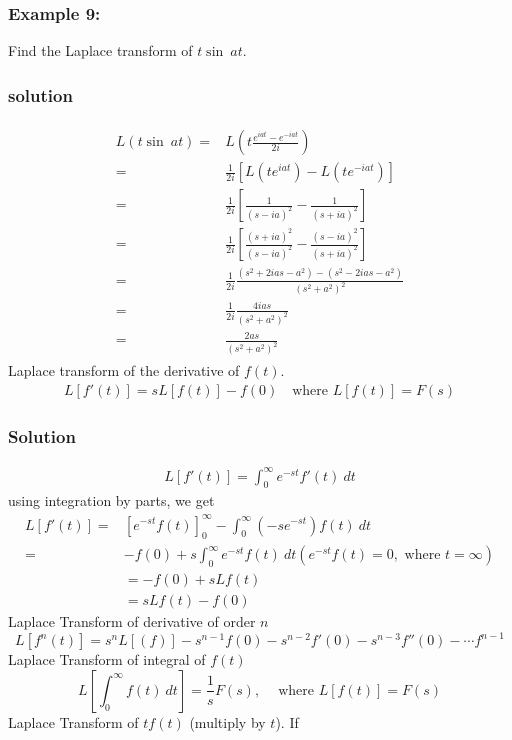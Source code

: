\documentclass[12pt]{report}
\begin{document}
\subsubsection{Example 9:}
Find the Laplace transform of $t \sin~at$.
\subsubsection{solution}
\begin{align*}
\begin{split}
L(t \sin~at)=&L \left( t \frac{e^{iat}-e^{-iat}}{2i}\right) \\
=& \frac{1}{2i}[L(te^{iat})-L(te^{-iat})] \\
=& \frac{1}{2i}\left[\frac{1}{(s-ia)^2}-\frac{1}{(s+ia)^2}\right] \\
=& \frac{1}{2i}\left[\frac{(s+ia)^2}{(s-ia)^2}-\frac{(s-ia)^2}{(s+ia)^2}\right] \\
=& \frac{1}{2i} \frac{(s^2+2ias-a^2)-(s^2-2ias-a^2)}{(s^2+a^2)^2} \\
=& \frac{1}{2i}\frac{4ias}{(s^2+a^2)^2} \\
=& \frac{2as}{(s^2+a^2)^2}
\end{split}
\end{align*}
Laplace transform of the derivative of $f(t)$.
\begin{align*}
L[f'(t)]=sL[f(t)]-f(0) ~~~\mbox{ where } L[f(t)]=F(s)
\end{align*}
\subsubsection{Solution}
\begin{align*}
L[f'(t)]= \int_0^\infty e^{-st}f'(t)~dt
\end{align*}
using integration by parts, we get
\begin{align*}
L[f'(t)]=&\left[e^{-st}f(t)\right]_0^\infty-\int_0^\infty (-se^{-st})f(t)~dt \\
=& -f(0)+s \int_0^\infty e^{-st}f(t)~dt (e^{-st}f(t)=0, \mbox{  where } t=\infty) \\
&= -f(0)+sLf(t) \\
&= sLf(t)-f(0)
\end{align*}
Laplace Transform of derivative of order $n$
\begin{equation*}
L[f^n(t)]=s^nL[(f)]-s^{n-1}f(0)-s^{n-2}f'(0)-s^{n-3}f''(0)-\cdots f^{n-1}
\end{equation*}
Laplace Transform of integral of $f(t)$
\begin{equation*}
L \left[\int_0^\infty f(t)~dt\right]=\frac{1}{s}F(s),~~~~\mbox{ where } L[f(t)]=F(s)
\end{equation*}
Laplace Transform of $tf(t)$ (multiply by $t$). If
\end{document}
